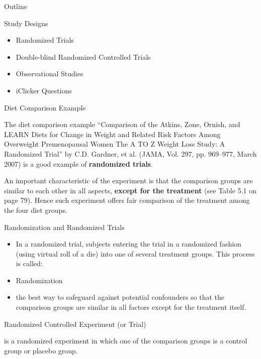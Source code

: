 \documentclass[14pt]{beamer}\usepackage[]{graphicx}\usepackage[]{color}
\begin{document}
\begin{frame}[fragile]{Outline}

Study Designs  

\begin{itemize}
\item Randomized Trials
\item Double-blind Randomized Controlled Trials  
\item Observational Studies
\item iClicker Questions
\end{itemize}
\end{frame}

\begin{frame}[fragile]{Diet Comparison Example}

The diet comparison example ``Comparison of the Atkins, Zone,  Ornish, and LEARN Diets for Change in Weight and Related Risk  Factors Among Overweight Premenopausal Women The A TO Z  Weight Loss Study: A Randomized Trial'' by C.D. Gardner, et al.  (JAMA, Vol. 297, pp. 969–977, March 2007) is a good example of  \textbf{randomized trials}.

An important characteristic of the experiment is that the comparison  groups are similar to each other in all aspects, \textbf{except for the  treatment} (see Table 5.1 on page 79). Hence such experiment offers  fair comparison of the treatment among the four diet groups.
\end{frame}

\begin{frame}[fragile]{Randomization and Randomized Trials}

\begin{itemize}
\item<1-> In a randomized trial, subjects entering the trial in a randomized  fashion (using virtual roll of a die) into one of several treatment groups.  This process is called:

\item<2-> Randomization

\item<3-> the best way to safeguard against potential confounders so that the  comparison groups are similar in all factors except for the treatment  itself.
\end{itemize}
\end{frame}

\begin{frame}[fragile]{Randomized Controlled Experiment (or Trial)}

is a randomized experiment in which one of the comparison groups is  a control group or placebo group.
\end{frame}
\end{document}
